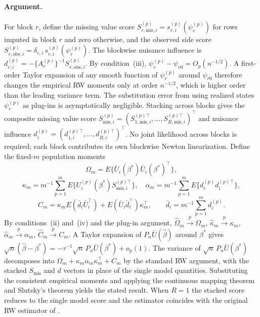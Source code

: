 \paragraph{Argument.}
For block \(r\), define the missing value score
\(S_{r,\mathrm{mis},i}^{(p)}=s_{r,i}^{(p)}(\psi_r^{(p)})\) for rows
imputed in block \(r\) and zero otherwise, and the observed side score
\(S_{r,\mathrm{obs},i}^{(p)}=\delta_{r,i}\,s_{r,i}^{(p)}(\psi_r^{(p)})\).
The blockwise nuisance influence is
\(d_{r,i}^{(p)}=-\{A_r^{(p)}\}^{-1}S_{r,\mathrm{obs},i}^{(p)}\).
By condition~(iii), \(\psi_r^{(p)}-\psi_{r0}=O_p(n^{-1/2})\).  A
first-order Taylor expansion of any smooth function of \(\psi_r^{(p)}\)
around \(\psi_{r0}\) therefore changes the empirical RW moments only at
order \(n^{-1/2}\), which is higher order than the leading variance
term.  The substitution error from using realized states \(\psi_r^{(p)}\)
as plug-ins is asymptotically negligible.
Stacking across blocks gives the composite missing value score
\(S_{\mathrm{mis},i}^{(p)}
=(S_{1,\mathrm{mis},i}^{(p)\top},\ldots,S_{R,\mathrm{mis},i}^{(p)\top})^\top\)
and nuisance influence
\(d_i^{(p)}=(d_{1,i}^{(p)\top},\ldots,d_{R,i}^{(p)\top})^\top\).
No joint likelihood across blocks is required; each block contributes
its own blockwise Newton linearization.
Define the fixed-\(m\) population moments
\[
\Omega_m=E\{\bar U_i(\beta^\ast)\bar U_i(\beta^\ast)^\top\},
\]
\[
\kappa_m=m^{-1}\!\sum_{p=1}^m\!
E\{U_i^{(p)}(\beta^\ast)S_{\mathrm{mis},i}^{(p)\top}\},
\quad
\alpha_m=m^{-1}\!\sum_{p=1}^m\! E\{d_i^{(p)}d_i^{(p)\top}\},
\]
\[
C_m=\kappa_m E(\bar d_i\bar U_i^\top)
+E(\bar U_i\bar d_i^\top)\kappa_m^\top,
\qquad
\bar d_i=m^{-1}\sum_{p=1}^m d_i^{(p)}.
\]
By conditions~(ii) and~(iv) and the plug-in argument,
\(\widehat\Omega_m\overset{p}{\to}\Omega_m\),
\(\widehat\kappa_m\overset{p}{\to}\kappa_m\),
\(\widehat\alpha_m\overset{p}{\to}\alpha_m\),
\(\widehat C_m\overset{p}{\to}C_m\).
A Taylor expansion of \(P_n\bar U(\hat\beta)\) around \(\beta^\ast\)
gives
\(\sqrt n(\hat\beta-\beta^\ast)
=-\tau^{-1}\sqrt n\,P_n\bar U(\beta^\ast)+o_p(1)\).
The variance of \(\sqrt n\,P_n\bar U(\beta^\ast)\) decomposes into
\(\Omega_m+\kappa_m\alpha_m\kappa_m^\top+C_m\) by the standard RW
argument, with the stacked \(S_{\mathrm{mis}}\) and \(d\) vectors in
place of the single model quantities.  Substituting the consistent
empirical moments and applying the continuous mapping theorem and
Slutsky's theorem yields the stated result.  When \(R=1\) the stacked
score reduces to the single model score and the estimator coincides
with the original RW estimator of \citet{robins2000inference}.
